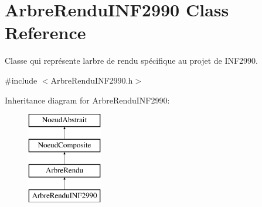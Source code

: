 \hypertarget{class_arbre_rendu_i_n_f2990}{}\section{Arbre\+Rendu\+I\+N\+F2990 Class Reference}
\label{class_arbre_rendu_i_n_f2990}


Classe qui représente l\textquotesingle{}arbre de rendu spécifique au projet de I\+N\+F2990.  




{\ttfamily \#include $<$Arbre\+Rendu\+I\+N\+F2990.\+h$>$}

Inheritance diagram for Arbre\+Rendu\+I\+N\+F2990\+:\begin{figure}[H]
\begin{center}
\leavevmode
\includegraphics[height=4.000000cm]{class_arbre_rendu_i_n_f2990}
\end{center}
\end{figure}
